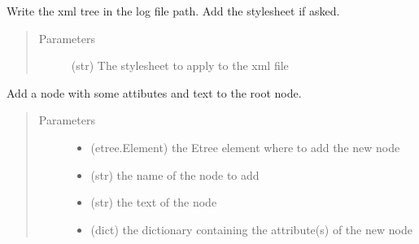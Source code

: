 \documentclass[a4paper,10pt,english]{sphinxmanual}
\begin{document}
\begin{fulllineitems}
\begin{fulllineitems}
\begin{quote}
\begin{description}
\end{description}\end{quote}

\end{fulllineitems}


\begin{fulllineitems}
\label{\detokenize{apidoc_src/src:src.xmlManager.XmlLogFile.write_tree}}
Write the xml tree in the log file path. Add the stylesheet if asked.
\begin{quote}\begin{description}
\item[{Parameters}] \leavevmode
{} \textendash{} (str) The stylesheet to apply to the xml file

\end{description}\end{quote}

\end{fulllineitems}


\end{fulllineitems}


\begin{fulllineitems}
\label{\detokenize{apidoc_src/src:src.xmlManager.add_simple_node}}
Add a node with some attibutes and text to the root node.
\begin{quote}\begin{description}
\item[{Parameters}] \leavevmode\begin{itemize}
\item {} 
 \textendash{} (etree.Element) 
the Etree element where to add the new node

\item {} 
 \textendash{} (str) the name of the node to add

\item {} 
 \textendash{} (str) the text of the node

\item {} 
 \textendash{} (dict) 
the dictionary containing the attribute(s) of the new node

\end{itemize}

\end{description}\end{quote}

\end{fulllineitems}
\end{document}
